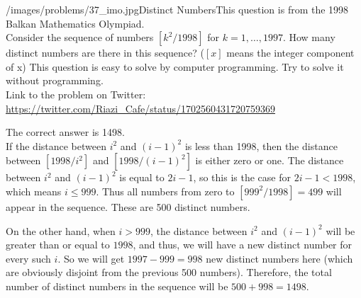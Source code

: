 \begin{problem}{/images/problems/37_imo.jpg}{Distinct Numbers}This question is from the 1998 Balkan Mathematics Olympiad.\\[0.2cm]

Consider the sequence of numbers $[k^2/1998]$ for $k = 1, \ldots, 1997$. How many distinct numbers are there in this sequence? ($[x]$ means the integer component of x) This question is easy to solve by computer programming. Try to solve it without programming.\\[0.2cm]

Link to the problem on Twitter:  \url{https://twitter.com/Riazi_Cafe/status/1702560431720759369}\end{problem}
\begin{solution}
The correct answer is 1498.\\[0.2cm]

If the distance between $i^2$ and $(i-1)^2$ is less than 1998, then the distance between $[1998/i^2]$ and $[1998/(i-1)^2]$ is either zero or one. The distance between $i^2$ and $(i-1)^2$ is equal to $2i-1$, so this is the case for $2i-1 < 1998$, which means $i \leq 999$. Thus all numbers from zero to $[999^2/1998]=499$ will appear in the sequence. These are 500 distinct numbers.

On the other hand, when $i > 999$, the distance between $i^2$ and $(i-1)^2$ will be greater than or equal to $1998$, and thus, we will have a new distinct number for every such $i$. So we will get $1997-999=998$ new distinct numbers here (which are obviously disjoint from the previous 500 numbers). Therefore, the total number of distinct numbers in the sequence will be $500+998=1498$.
\end{solution}
